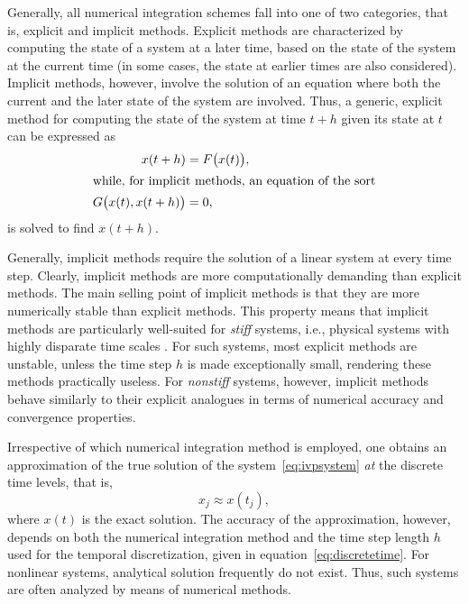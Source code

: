 Generally, all numerical integration schemes fall into one of two categories,
that is, explicit and implicit methods. Explicit methods are characterized
by computing the state of a system at a later time, based on the state of
the system at the current time (in some cases, the state at earlier times
are also considered). Implicit methods, however, involve the solution of
an equation where both the current and the later state of the system are
involved. Thus, a generic, explicit method for computing the state of the
system at time $t+h$ given its state at $t$ can be expressed as
\begin{subequations}
    \label{eq:exim}
    \begin{align}
    \label{eq:exim_ex}
    x(t+h) &= F\big(x(t)\big),\\
    \intertext{while, for implicit methods, an equation of the sort}
    \label{eq:exim_im}
    G\big(x(t),x(t+h)\big)&=0,
    \end{align}
\end{subequations}
is solved to find $x(t+h)$.

Generally, implicit methods require the solution of a linear system at every
time step. Clearly, implicit methods are more computationally demanding than
explicit methods. The main selling point of implicit methods is that they
are more numerically stable than explicit methods. This property means that
implicit methods are particularly well-suited for \emph{stiff} systems, i.e.,
physical systems with highly disparate time scales
\parencite[p.2]{hairer1996solving}. For such systems, most explicit methods
are unstable, unless the time step $h$ is made exceptionally small, rendering
these methods practically useless. For \emph{nonstiff} systems, however,
implicit methods behave similarly to their explicit analogues in terms of
numerical accuracy and convergence properties.

Irrespective of which numerical integration method is employed, one obtains
an approximation of the true solution of the system~\eqref{eq:ivpsystem}
\emph{at} the discrete time levels, that is,
\begin{equation}
    \label{eq:numericalintegratorapproximatesolution}
    x_{j} \approx x(t_{j}),
\end{equation}
where $x(t)$ is the exact solution. The accuracy of the approximation, however,
depends on both the numerical integration method and the time step length $h$
used for the temporal discretization, given in equation~\eqref{eq:discretetime}.
For nonlinear systems, analytical solution frequently do not exist. Thus,
such systems are often analyzed by means of numerical methods.
